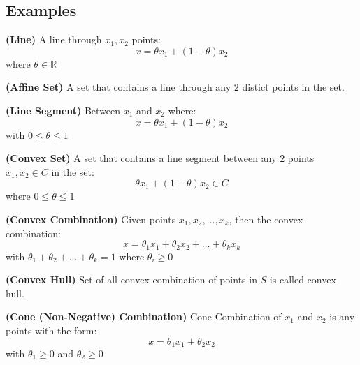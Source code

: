 \subsection{Examples}

\begin{definition}{\textbf{(Line)}}
    A line through $x_1, x_2$ points:
    \begin{equation*}
        x = \theta x_1 + (1-\theta)x_2
    \end{equation*}
    where $\theta\in \mathbb{R}$
\end{definition}

\begin{definition}{\textbf{(Affine Set)}}
    A set that contains a line through any $2$ distict points in the set.
\end{definition}

\begin{definition}{\textbf{(Line Segment)}}
    Between $x_1$ and $x_2$ where:
    \begin{equation*}
        x = \theta x_1 + (1-\theta)x_2
    \end{equation*}
    with $0\le\theta\le1$
\end{definition}

\begin{definition}{\textbf{(Convex Set)}}
    A set that contains a line segment between any $2$ points $x_1, x_2 \in C$ in the set:
    \begin{equation*}
        \theta x_1 + (1-\theta) x_2 \in C
    \end{equation*}
    where $0\le\theta\le1$
\end{definition}

\begin{definition}{\textbf{(Convex Combination)}}
    Given points $x_1,x_2,\dots,x_k$, then the convex combination:
    \begin{equation*}
        x = \theta_1x_1 + \theta_2x_2 + \dots + \theta_kx_k
    \end{equation*}
    with $\theta_1+\theta_2+\dots+\theta_k = 1$ where $\theta_i\ge0$
\end{definition}

\begin{definition}{\textbf{(Convex Hull)}}
    Set of all convex combination of points in $S$ is called convex hull. 
\end{definition}

\begin{definition}{\textbf{(Cone (Non-Negative) Combination)}}
    Cone Combination of $x_1$ and $x_2$ is any points with the form:
    \begin{equation*}
        x = \theta_1x_1 + \theta_2x_2
    \end{equation*}
    with $\theta_1\ge0$ and $\theta_2\ge0$
\end{definition}

